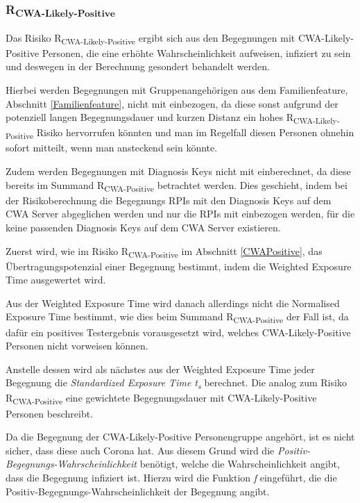 \documentclass[conference,compsoc]{IEEEtran}
\begin{document}
\subsubsection{R\textsubscript{CWA-Likely-Positive}}
\label{CWALikelyPositive}

Das Risiko R\textsubscript{CWA-Likely-Positive} ergibt sich aus den Begegnungen mit CWA-Likely-Positive Personen, 
die eine erhöhte Wahrscheinlichkeit aufweisen, infiziert zu sein und deswegen in der Berechnung gesondert behandelt werden. 

Hierbei werden Begegnungen mit Gruppenangehörigen aus dem Familienfeature, Abschnitt \ref{Familienfeature}, nicht mit einbezogen, 
da diese sonst aufgrund der potenziell langen Begegnungsdauer und kurzen Distanz ein hohes R\textsubscript{CWA-Likely-Positive} Risiko hervorrufen könnten und 
man im Regelfall diesen Personen ohnehin sofort mitteilt, wenn man ansteckend sein könnte. 

Zudem werden Begegnungen mit Diagnosis Keys nicht mit einberechnet, da diese bereits im Summand R\textsubscript{CWA-Positive} betrachtet werden. 
Dies geschieht, indem bei der Risikoberechnung die Begegnungs RPIs mit den Diagnosis Keys auf dem CWA Server abgeglichen werden und nur die RPIs mit einbezogen werden, 
für die keine passenden Diagnosis Keys auf dem CWA Server existieren.

Zuerst wird, wie im Risiko R\textsubscript{CWA-Positive} im Abschnitt \ref{CWAPositive}, das Übertragungspotenzial einer Begegnung bestimmt, 
indem die Weighted Exposure Time ausgewertet wird. 

Aus der Weighted Exposure Time wird danach allerdings nicht die Normalised Exposure Time bestimmt, wie dies beim Summand R\textsubscript{CWA-Positive} der Fall ist, 
da dafür ein positives Testergebnis vorausgesetzt wird, welches CWA-Likely-Positive Personen nicht vorweisen können.

Anstelle dessen wird als nächstes aus der Weighted Exposure Time jeder Begegnung die \textit{Standardized Exposure Time t\textsubscript{s}} berechnet.
Die analog zum Risiko R\textsubscript{CWA-Positive} eine gewichtete Begegnungsdauer mit CWA-Likely-Positive Personen beschreibt.

Da die Begegnung der CWA-Likely-Positive Personengruppe angehört, ist es nicht sicher, dass diese auch Corona hat. 
Aus diesem Grund wird die \textit{Positiv-Begegnungs-Wahrscheinlichkeit} benötigt, welche die Wahrscheinlichkeit angibt, dass die Begegnung infiziert ist. 
Hierzu wird die Funktion \textit{f} eingeführt, die die Positiv-Begegnungs-Wahrscheinlichkeit der Begegnung angibt.
\end{document}
